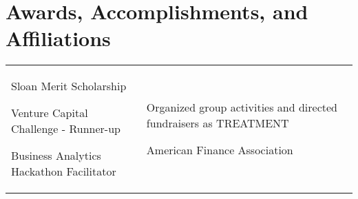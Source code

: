 \documentclass[a4paper,10pt]{article}
\begin{document}
\smallskip
\section{Awards, Accomplishments, and Affiliations}
\begin{supertabular}{p{8.65cm} p{8.65cm}}

	\begin{enumerate*}[label =$\circ$, itemjoin={\newline}]
		\item \small Sloan Merit Scholarship
		\item \small Venture Capital Challenge - Runner-up
		\item \small Business Analytics Hackathon Facilitator
		\end{enumerate*}


	& \begin{enumerate*}[label =$\circ$, itemjoin={\newline}]
                                \item \small Organized group activities and directed fundraisers as TREATMENT
                                \item \small American Finance Association
                                \end{enumerate*}  \vspace{2mm} \\



\end{supertabular}




\smallskip
\end{document}

